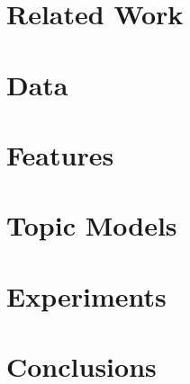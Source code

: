 \documentclass[a4paper,10pt,twoside]{report}
\begin{document}
\clearemptydoublepage

\chapter{Related Work}\label{chapter:related_work}


\clearemptydoublepage

\chapter{Data}\label{chapter:data_description}


\clearemptydoublepage

\chapter{Features}\label{chapter:features}


\clearemptydoublepage

\chapter{Topic Models}\label{chapter:topic_models}


\clearemptydoublepage

\chapter{Experiments}\label{chapter:experiments}


\clearemptydoublepage

\chapter{Conclusions}\label{chapter:conclusions}


\clearemptydoublepage

%



 \clearemptydoublepage
 
 \appendix
 
 
 
\end{document}

